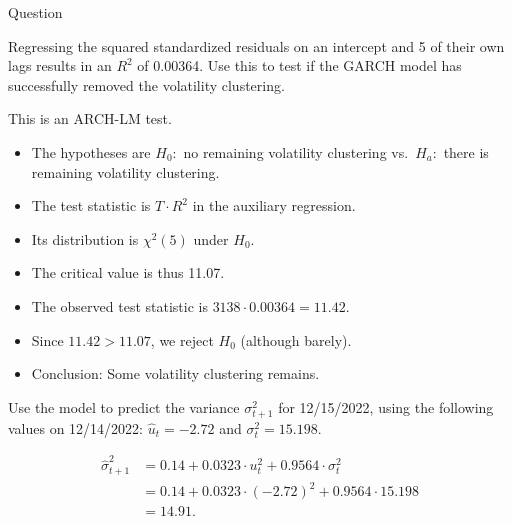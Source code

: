 \documentclass[12pt, a4paper]{article}
\begin{document}
\begin{exam}{Question \thequestion}
\begin{problem}[6]
\begin{solution}[10cm]
\end{solution}
\end{problem}
\begin{problem}[6]
Regressing the squared standardized residuals on an intercept and 5 of their own lags results in an $R^2$ of 0.00364. Use this to test if the GARCH model has successfully removed the volatility clustering.
\begin{solution}[10cm]
This is an ARCH-LM test.
\begin{itemize}
\item The hypotheses are $H_0:$ no remaining volatility clustering vs.\ $H_a:$ there is remaining volatility clustering.
\item The test statistic is $T \cdot R^2$ in the auxiliary regression.
\item Its distribution is $\chi^2(5)$ under $H_0$.
\item The critical value is thus 11.07.
\item The observed test statistic is $3138 \cdot 0.00364 = 11.42$.
\item Since $11.42 > 11.07$, we reject $H_0$ (although barely).
\item Conclusion: Some volatility clustering remains.
\end{itemize}
\end{solution}
\end{problem}
\begin{problem}[6]
Use the model to predict the variance $\sigma^2_{t+1}$ for 12/15/2022, using the following values on 12/14/2022: $\hat{u}_t=-2.72$ and $\sigma^2_t = 15.198$.
\begin{solution}[10cm]
\begin{align*}
\widehat{\sigma}^2_{t+1} & = 0.14 + 0.0323 \cdot  u_t^2 + 0.9564 \cdot \sigma_t^2\\
& = 0.14 + 0.0323 \cdot (-2.72) ^2  + 0.9564 \cdot 15.198\\
& = 14.91.
\end{align*}

\end{solution}
\end{problem}
\end{exam}
\newpage
{}
\end{document}
